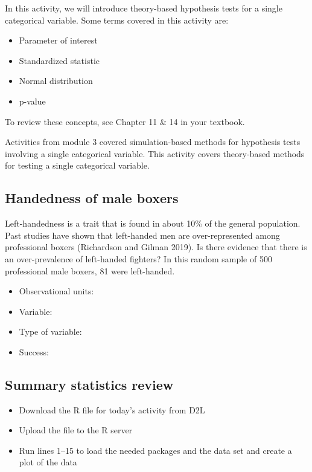\documentclass[
]{report}
\begin{document}
In this activity, we will introduce theory-based hypothesis tests for a single categorical variable. Some terms covered in this activity are:

\begin{itemize}
\item
  Parameter of interest
\item
  Standardized statistic
\item
  Normal distribution
\item
  p-value
\end{itemize}

To review these concepts, see Chapter 11 \& 14 in your textbook.

Activities from module 3 covered simulation-based methods for hypothesis tests involving a single categorical variable. This activity covers theory-based methods for testing a single categorical variable.

\subsection{Handedness of male boxers}\label{handedness-of-male-boxers}

Left-handedness is a trait that is found in about 10\% of the general population. Past studies have shown that left-handed men are over-represented among professional boxers (Richardson and Gilman 2019). Is there evidence that there is an over-prevalence of left-handed fighters? In this random sample of 500 professional male boxers, 81 were left-handed.

\begin{itemize}
\item
  Observational units:
\item
  Variable:
\item
  Type of variable:
\item
  Success:
\end{itemize}

\subsection{Summary statistics review}\label{summary-statistics-review}

\begin{itemize}
\item
  Download the R file for today's activity from D2L
\item
  Upload the file to the R server
\item
  Run lines 1--15 to load the needed packages and the data set and create a plot of the data
\end{itemize}
\end{document}
